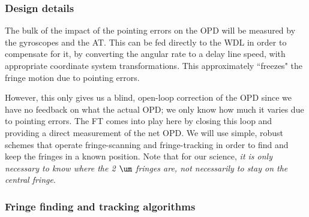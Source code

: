 

\subsubsection{Design details}

The bulk of the impact of the pointing errors on the OPD will be measured by the gyroscopes and the AT. This can be fed directly to the WDL in order to compensate for it, by converting the angular rate to a delay line speed, with appropriate coordinate system transformations. This approximately ``freezes" the fringe motion due to pointing errors.

However, this only gives us a blind, open-loop correction of the OPD since we have no feedback on what the actual OPD; we only know how much it varies due to pointing errors. The FT comes into play here by closing this loop and providing a direct measurement of the net OPD. We will use simple, robust schemes that operate fringe-scanning and fringe-tracking in order to find and keep the fringes in a known position. Note that for our science, \textit{it is only necessary to know where the 2 $\um$ fringes are, not necessarily to stay on the central fringe}.

\subsubsection{Fringe finding and tracking algorithms}


